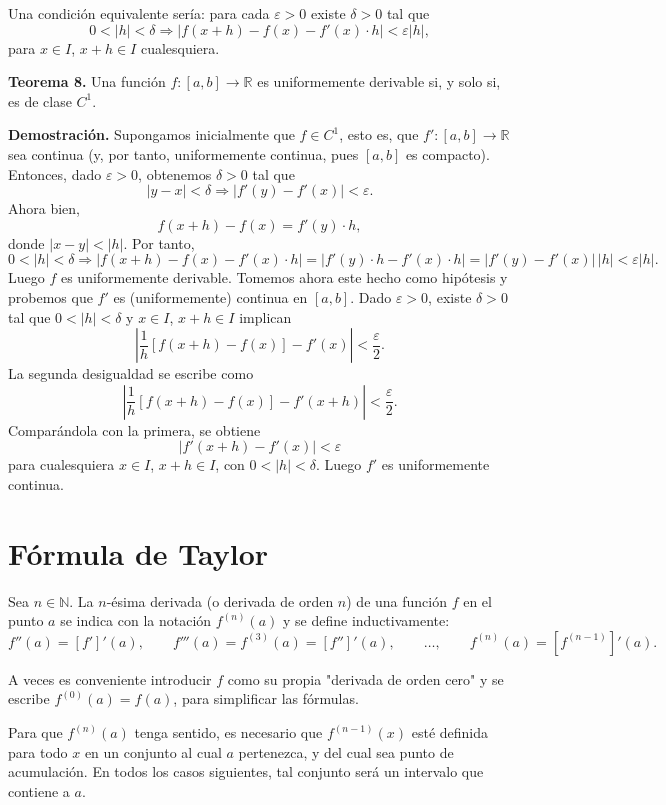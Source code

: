 \documentclass[12pt,oneside]{book}
\begin{document}
Una condición equivalente sería: para cada \( \varepsilon > 0 \) existe \( \delta > 0 \) tal que
\[
0 < |h| < \delta \Rightarrow |f(x + h) - f(x) - f'(x) \cdot h| < \varepsilon |h|,
\]
para \( x \in I \), \( x + h \in I \) cualesquiera.

\textbf{Teorema 8.} Una función \( f: [a, b] \to \mathbb{R} \) es uniformemente derivable si, y solo si, es de clase \( C^1 \).

\textbf{Demostración.} Supongamos inicialmente que \( f \in C^1 \), esto es, que \( f': [a, b] \to \mathbb{R} \) sea continua (y, por tanto, uniformemente continua, pues \( [a, b] \) es compacto). Entonces, dado \( \varepsilon > 0 \), obtenemos \( \delta > 0 \) tal que
\[
|y - x| < \delta \Rightarrow |f'(y) - f'(x)| < \varepsilon.
\]
Ahora bien,
\[
f(x + h) - f(x) = f'(y) \cdot h,
\]
donde \( |x - y| < |h| \). Por tanto,
\[
0 < |h| < \delta \Rightarrow |f(x + h) - f(x) - f'(x) \cdot h|
= |f'(y) \cdot h - f'(x) \cdot h|
= |f'(y) - f'(x)| \, |h|
< \varepsilon |h|.
\]
Luego \( f \) es uniformemente derivable. Tomemos ahora este hecho como hipótesis y probemos que \( f' \) es (uniformemente) continua en \( [a, b] \). Dado \( \varepsilon > 0 \), existe \( \delta > 0 \) tal que \( 0 < |h| < \delta \) y \( x \in I \), \( x + h \in I \) implican
\[
\left| \frac{1}{h} [f(x + h) - f(x)] - f'(x) \right| < \frac{\varepsilon}{2}.
\]
La segunda desigualdad se escribe como
\[
\left| \frac{1}{h} [f(x + h) - f(x)] - f'(x + h) \right| < \frac{\varepsilon}{2}.
\]
Comparándola con la primera, se obtiene
\[
|f'(x + h) - f'(x)| < \varepsilon
\]
para cualesquiera \( x \in I \), \( x + h \in I \), con \( 0 < |h| < \delta \). Luego \( f' \) es uniformemente continua.

\section{Fórmula de Taylor}

Sea \( n \in \mathbb{N} \). La \( n \)-ésima derivada (o derivada de orden \( n \)) de una función \( f \) en el punto \( a \) se indica con la notación \( f^{(n)}(a) \) y se define inductivamente:
\[
f''(a) = [f']'(a), \qquad f'''(a) = f^{(3)}(a) = [f'']'(a), \qquad \dots, \qquad f^{(n)}(a) = [f^{(n-1)}]'(a).
\]

A veces es conveniente introducir \( f \) como su propia "derivada de orden cero" y se escribe \( f^{(0)}(a) = f(a) \), para simplificar las fórmulas.

Para que \( f^{(n)}(a) \) tenga sentido, es necesario que \( f^{(n-1)}(x) \) esté definida para todo \( x \) en un conjunto al cual \( a \) pertenezca, y del cual sea punto de acumulación. En todos los casos siguientes, tal conjunto será un intervalo que contiene a \( a \).
\end{document}
